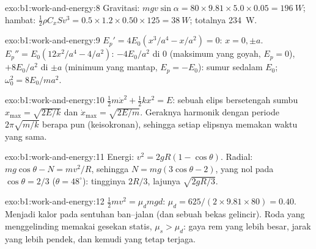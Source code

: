 \begin{solution}{exo:b1:work-and-energy:8}
Gravitasi: $mgv\sin\alpha = 80 \times 9.81 \times 5.0 \times 0.05 = \qty{196}{W}$;
hambat: $\tfrac12\rho C_xSv^3 = 0.5 \times 1.2 \times 0.50 \times 125 =
\qty{38}{W}$; totalnya \qty{234}{W}.
\end{solution}

\begin{solution}{exo:b1:work-and-energy:9}
$E_p' = 4E_0(x^3/a^4 - x/a^2) = 0$: $x = 0, \pm a$. $E_p'' = E_0(12x^2/a^4 -
4/a^2)$: $-4E_0/a^2$ di $0$ (maksimum yang goyah, $E_p = 0$), $+8E_0/a^2$
di $\pm a$ (minimum yang mantap, $E_p = -E_0$): sumur sedalam $E_0$;
$\omega_0^2 = 8E_0/ma^2$.
\end{solution}

\begin{solution}{exo:b1:work-and-energy:10}
$\tfrac12 m\dot x^2 + \tfrac12 kx^2 = E$: sebuah elips bersetengah sumbu $x_{\max}
= \sqrt{2E/k}$ dan $\dot x_{\max} = \sqrt{2E/m}$. Geraknya harmonik
dengan periode $2\pi\sqrt{m/k}$ berapa pun  (keisokronan),
sehingga setiap elipsnya memakan waktu yang sama.
\end{solution}

\begin{solution}{exo:b1:work-and-energy:11}
Energi: $v^2 = 2gR(1 - \cos\theta)$. Radial: $mg\cos\theta - N = mv^2/R$,
sehingga $N = mg(3\cos\theta - 2)$, yang nol pada $\cos\theta = 2/3$ ($\theta =
48^\circ$): tingginya $2R/3$, lajunya $\sqrt{2gR/3}$.
\end{solution}

\begin{solution}{exo:b1:work-and-energy:12}
$\tfrac12 mv^2 = \mu_dmgd$: $\mu_d = 625/(2 \times 9.81 \times 80) = 0.40$.
Menjadi kalor pada sentuhan ban--jalan (dan sebuah bekas gelincir). Roda
yang menggelinding memakai gesekan statis, $\mu_s > \mu_d$: gaya rem yang
lebih besar, jarak yang lebih pendek, dan kemudi yang tetap terjaga.
\end{solution}

